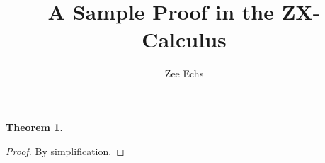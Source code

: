 \documentclass{article}
\title{A Sample Proof in the ZX-Calculus}
\author{Zee Echs}
\newtheorem{theorem}{Theorem}
\begin{document}
\maketitle

\begin{theorem}
\end{theorem}


\begin{proof}
  By simplification.
\end{proof}
\end{document}
